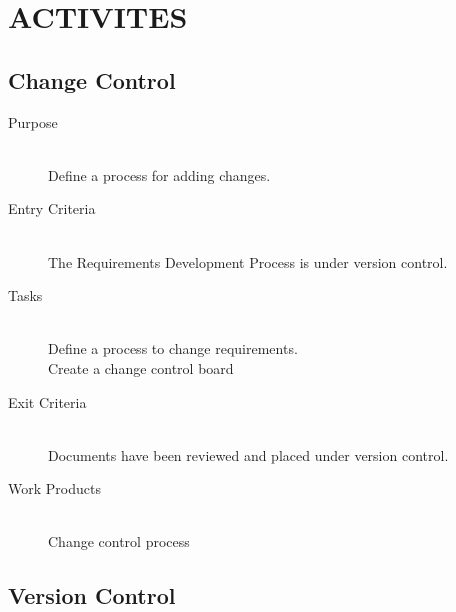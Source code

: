 \documentclass[11pt]{article}
\begin{document}
\section{ACTIVITES} 

\subsection{Change Control}

\begin{description}

\item[Purpose] \hfill \\
Define a process for adding changes.

\item[Entry Criteria]\hfill \\
The Requirements Development Process is under version control.

\item[Tasks]\hfill \\
Define a process to change requirements. \\
Create a change control board

\item[Exit Criteria]\hfill \\
Documents have been reviewed and placed under version control.  

\item[Work Products]\hfill \\
Change control process\\

\end{description}

\newpage
\subsection{Version Control} 
\end{document}
